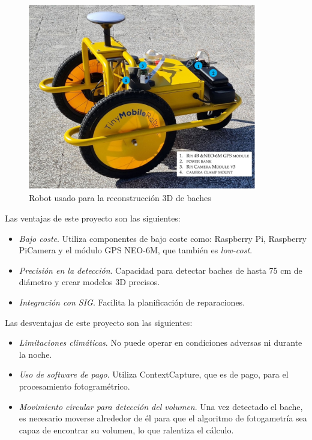 \begin{figure} [h!]
	\begin{center}
		\includegraphics[width=10cm]{figs/infrarob.png}
	\end{center}
	\caption{Robot usado para la reconstrucción 3D de baches}
\label{fig:infrarob}
\end{figure}

Las ventajas de este proyecto son las siguientes: 
\begin{itemize}
	\item \textit{Bajo coste}. Utiliza componentes de bajo coste como: Raspberry Pi, Raspberry PiCamera y el módulo GPS NEO-6M, que también es \textit{low-cost}. 
	\item \textit{Precisión en la detección}. Capacidad para detectar baches de hasta 75 cm de diámetro y crear modelos 3D precisos.
	\item \textit{Integración con \acs{SIG}}. Facilita la planificación de reparaciones.
\end{itemize}

Las desventajas de este proyecto son las siguientes: 
\begin{itemize}
	\item \textit{Limitaciones climáticas}. No puede operar en condiciones adversas ni durante la noche.
	\item \textit{Uso de software de pago}. Utiliza ContextCapture, que es de pago, para el procesamiento fotogramétrico.
	\item \textit{Movimiento circular para detección del volumen}. Una vez detectado el bache, es necesario moverse alrededor de él para que el algoritmo de fotogametría sea capaz de encontrar su volumen, lo que ralentiza el cálculo.
\end{itemize}


